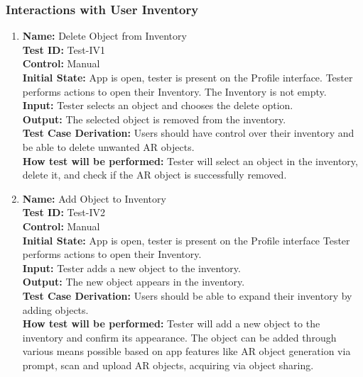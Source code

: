 \documentclass[12pt, titlepage]{article}
\begin{document}
\subsubsection{Interactions with User Inventory}

\begin{enumerate}

  \item \textbf{Name:} Delete Object from Inventory \label{itm:Test-IV1} \\
        \textbf{Test ID:} Test-IV1 \\
        \textbf{Control:} Manual \\
        \textbf{Initial State:} App is open, tester is present on the Profile interface. Tester performs actions to open their Inventory. The Inventory is not empty. \\
        \textbf{Input:} Tester selects an object and chooses the delete option. \\
        \textbf{Output:} The selected object is removed from the inventory. \\
        \textbf{Test Case Derivation:} Users should have control over their inventory and be able to delete unwanted AR objects. \\
        \textbf{How test will be performed:} Tester will select an object in the inventory, delete it, and check if the AR object is successfully removed. \\

  \item \textbf{Name:} Add Object to Inventory \label{itm:Test-IV2} \\
        \textbf{Test ID:} Test-IV2 \\
        \textbf{Control:} Manual \\
        \textbf{Initial State:} App is open, tester is present on the Profile interface Tester performs actions to open their Inventory. \\
        \textbf{Input:} Tester adds a new object to the inventory. \\
        \textbf{Output:} The new object appears in the inventory. \\
        \textbf{Test Case Derivation:} Users should be able to expand their inventory by adding objects. \\
        \textbf{How test will be performed:} Tester will add a new object to the inventory and confirm its appearance. The object can be added through various means possible based on app features like AR object generation via prompt, scan and upload AR objects, acquiring via object sharing. \\


\end{enumerate}
\end{document}
